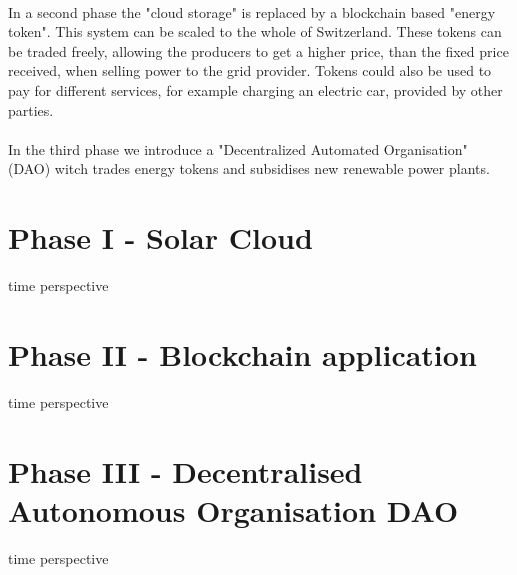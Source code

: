 \documentclass{scrartcl}
\begin{document}
	\paragraph{}
	In a second phase the "cloud storage" is replaced by a blockchain based "energy token". This system can be scaled to the whole of Switzerland. These tokens can be traded freely, allowing the producers to get a higher price, than the fixed price received, when selling power to the grid provider. Tokens could also be used to pay for different services, for example charging an electric car, provided by other parties. 
	
	\paragraph{}
	In the third phase we introduce a "Decentralized Automated Organisation" (DAO) witch trades energy tokens and subsidises new renewable power plants. 
	
	\section{Phase I - Solar Cloud}
	
	
	time perspective
	
	\section{Phase II - Blockchain application}
	
	time perspective
	
	\section{Phase III - Decentralised Autonomous Organisation DAO}
	
	time perspective
	
\end{document}
